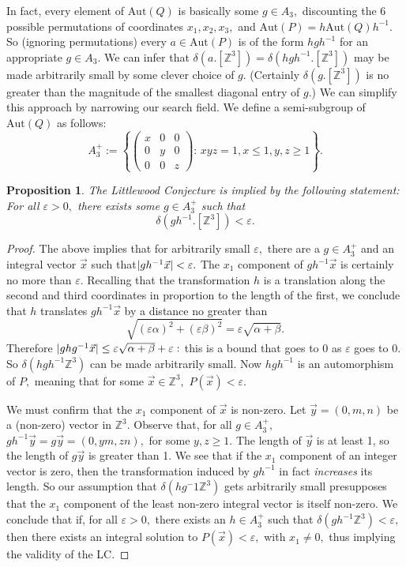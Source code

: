 \documentclass[12pt, letterpaper, oneside]{book}
\newcommand{\ga}{\ensuremath{\alpha}}
\newcommand{\gb}{\ensuremath{\beta}}
\newcommand{\gd}{\ensuremath{\delta}}
\renewcommand{\ge}{\ensuremath{\varepsilon}}
\newcommand{\Z}{\mathbb{Z}}
\DeclarePairedDelimiter{\abs}{\lvert}{\rvert}
\theoremstyle{plain}
\newtheorem{tion}{Proposition}
\theoremstyle{definition}
\theoremstyle{remark}
\begin{document}
In fact, every element of $\mbox{Aut}(Q)$ is basically some $g \in A_3,$ discounting the 6 possible permutations of coordinates $x_1,x_2,x_3,$ and $\mbox{Aut}(P) = h\mbox{Aut}(Q)h^{-1}.$ So (ignoring permutations) every $a \in \mbox{Aut}(P)$ is of the form $hgh^{-1}$ for an appropriate $g \in A_3.$ We can infer that $\gd(a.[\Z^3]) = \gd(hgh^{-1}.[\Z^3])$ may be made arbitrarily small by some clever choice of $g.$ (Certainly $\gd(g.[\Z^3])$ is no greater than the magnitude of the smallest diagonal entry of $g.$) 
We can simplify this approach by narrowing our search field. We define a semi-subgroup of $\mbox{Aut}(Q)$ as follows:
\[
A_3^+ := \left \{ \begin{pmatrix}
x & 0 & 0 \\
0 & y & 0 \\
0 & 0 & z
\end{pmatrix}:\,xyz = 1, x \leq 1, y,z \geq 1 \right \}.
\]
\begin{tion}
The Littlewood Conjecture is implied by the following statement: For all $\ge > 0,$ there exists some $g \in A_3^+$ such that
\[
\gd(gh^{-1}.[\Z^3]) < \ge.
\]
\end{tion}
\begin{proof}
The above implies that for arbitrarily small $\ge,$ there are a $g \in A_3^+$ and an integral vector $\vec{x}$ such that$\abs{gh^{-1}\vec{x}} < \ge.$ The $x_1$ component of $gh^{-1}\vec{x}$ is certainly no more than $\ge.$ Recalling that the transformation $h$ is a translation along the second and third coordinates in proportion to the length of the first, we conclude that  $h$ translates $gh^{-1}\vec{x}$ by a distance no greater than 
\[
\sqrt{(\ge\ga)^2 + (\ge\gb)^2} = \ge\sqrt{\ga + \gb}.
\]
Therefore $\abs{ghg^{-1}\vec{x}} \leq \ge\sqrt{\ga + \gb} + \ge:$ this is a bound that goes to 0 as $\ge$ goes to 0. So $\gd(hgh^{-1}\Z^3)$ can be made arbitrarily small. Now $hgh^{-1}$ is an automorphism of $P,$ meaning that for some $\vec{x} \in \Z^3,$ $P(\vec{x}) < \ge.$

We must confirm that the $x_1$ component of $\vec{x}$ is non-zero. Let $\vec{y} = (0, m, n)$ be a (non-zero) vector in $\Z^3.$  Observe that, for all $g \in A_3^+,$ $gh^{-1}\vec{y} = g\vec{y} = (0, ym, zn),$ for some $y,z \geq 1.$ The length of $\vec{y}$ is at least 1, so the length of $g\vec{y}$ is greater than 1. We see that if the $x_1$ component of an integer vector is zero, then the transformation induced by $gh^{-1}$ in fact \textit{increases} its length. So our assumption that $\gd(hg^-1\Z^3)$ gets arbitrarily small presupposes that the $x_1$ component of the least non-zero integral vector is itself non-zero. We conclude that if, for all $\ge > 0,$ there exists an $h \in A_3^+$ such that $\gd(gh^{-1}\Z^3) < \ge,$ then there exists an integral solution to $P(\vec{x}) < \ge,$ with $x_1 \neq 0,$ thus implying the validity of the LC. 
\end{proof}
\end{document}
